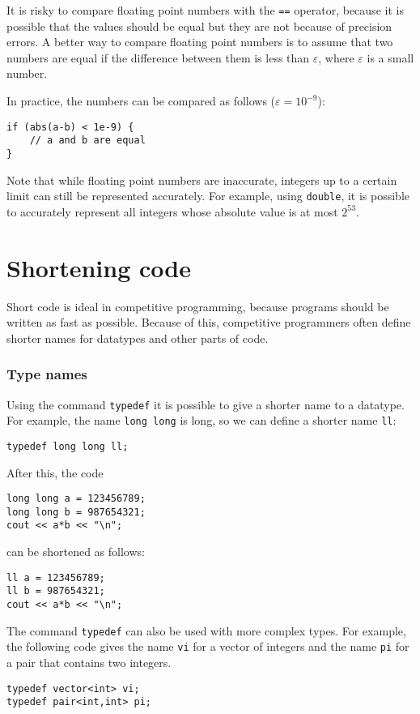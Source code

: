 It is risky to compare floating point numbers
with the \texttt{==} operator,
because it is possible that the values should be
equal but they are not because of precision errors.
A better way to compare floating point numbers
is to assume that two numbers are equal
if the difference between them is less than $\varepsilon$,
where $\varepsilon$ is a small number.

In practice, the numbers can be compared
as follows ($\varepsilon=10^{-9}$):

\begin{lstlisting}
if (abs(a-b) < 1e-9) {
    // a and b are equal
}
\end{lstlisting}

Note that while floating point numbers are inaccurate,
integers up to a certain limit can still be
represented accurately.
For example, using \texttt{double},
it is possible to accurately represent all
integers whose absolute value is at most $2^{53}$.

\section{Shortening code}

Short code is ideal in competitive programming,
because programs should be written
as fast as possible.
Because of this, competitive programmers often define
shorter names for datatypes and other parts of code.

\subsubsection{Type names}
Using the command \texttt{typedef}
it is possible to give a shorter name
to a datatype.
For example, the name \texttt{long long} is long,
so we can define a shorter name \texttt{ll}:
\begin{lstlisting}
typedef long long ll;
\end{lstlisting}
After this, the code
\begin{lstlisting}
long long a = 123456789;
long long b = 987654321;
cout << a*b << "\n";
\end{lstlisting}
can be shortened as follows:
\begin{lstlisting}
ll a = 123456789;
ll b = 987654321;
cout << a*b << "\n";
\end{lstlisting}

The command \texttt{typedef}
can also be used with more complex types.
For example, the following code gives
the name \texttt{vi} for a vector of integers
and the name \texttt{pi} for a pair
that contains two integers.
\begin{lstlisting}
typedef vector<int> vi;
typedef pair<int,int> pi;
\end{lstlisting}

